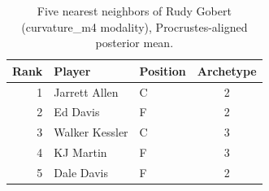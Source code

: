 \begin{table}[htbp]
  \centering\small
  \begin{tabular}{rllc}
    \toprule
    Rank & Player & Position & Archetype \\
    \midrule
    1 & Jarrett Allen & C & 2 \\
    2 & Ed Davis & F & 2 \\
    3 & Walker Kessler & C & 3 \\
    4 & KJ Martin & F & 3 \\
    5 & Dale Davis & F & 2 \\
    \bottomrule
  \end{tabular}
  \caption{Five nearest neighbors of Rudy Gobert (curvature_m4 modality), Procrustes-aligned posterior mean.}
  \label{tab:Rudy_Gobert_neighbors_curvature_m4}
\end{table}

